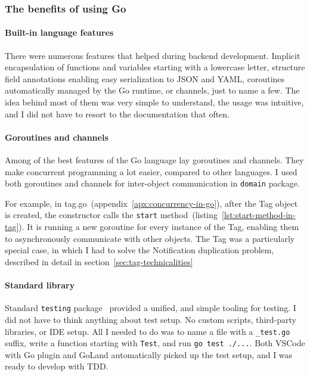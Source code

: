 \subsubsection{The benefits of using Go}\label{sec:the-benefits-of-using-go}

\paragraph*{Built-in language features}\label{sec:built-in-language-features}

There were numerous features
that helped during backend development.
Implicit encapsulation of functions and variables
starting with a lowercase letter,
structure field annotations
enabling easy serialization
to \ac{JSON} and \ac{YAML},
coroutines automatically managed by the Go runtime,
or channels,
just to name a few.
The idea behind most of them
was very simple to understand,
the usage was intuitive,
and I did not have to resort to the documentation that often.

\paragraph*{Goroutines and channels}\label{sec:goroutines-and-channels}

Among of the best features of the Go language lay goroutines and channels.
They make concurrent programming a lot easier, compared to other languages.
I used both goroutines and channels
for inter-object communication in \texttt{domain} package.

For example, in {tag.go}~(appendix~\ref{apx:concurrency-in-go}),
after the Tag object is created,
the constructor calls
the \texttt{start} method~(listing~\ref{lst:start-method-in-tag}).
It is running a new goroutine for every instance of the Tag,
enabling them to asynchronously communicate with other objects.
The Tag was a particularly special case,
in which I had to solve
the Notification duplication problem,
described in detail in section~\ref{sec:tag-technicalities}

\paragraph*{Standard library}\label{sec:standard-library}

Standard \texttt{testing} package~\cite{cox_testing_2022} provided
a unified, and simple tooling for testing.
I did not have to think anything about test setup.
No custom scripts, third-party libraries, or \ac{IDE} setup.
All I needed to do was to name a file with a \texttt{\_test.go} suffix,
write a function starting with \texttt{Test},
and run \texttt{go\ test\ ./...}.
Both \ac{VSCode} with Go plugin and GoLand
automatically picked up the test setup,
and I was ready to develop with \ac{TDD}.

